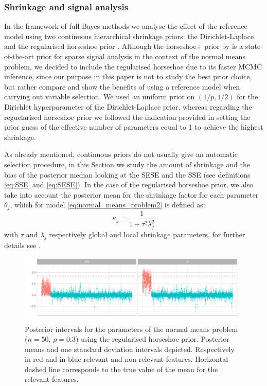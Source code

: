 \documentclass[american,]{article}
\theoremstyle{definition}
\begin{document}
\hypertarget{shrinkage-signal}{%
\subsubsection{Shrinkage and signal analysis}\label{shrinkage-signal}}
In the framework of full-Bayes methods we analyse the effect of the reference model using two continuous hierarchical shrinkage priors: the Dirichlet-Laplace \citep{paper:dirichlet_laplace} and the regularised horseshoe prior \citep{paper:rhs}. Although the horseshoe+ prior by \cite{paper:horseshoe+} is a state-of-the-art prior for sparse signal analysis in the context of the normal means problem, we decided to include the regularised horseshoe due to its faster MCMC inference, since our purpose in this paper is not to study the best prior choice, but rather compare and show the benefits of using a reference model when carrying out variable selection. We used an uniform prior on $(1/p,1/2)$ for the Dirichlet hyperparameter of the Dirichlet-Laplace prior, whereas regarding the reguelarised horseshoe prior we followed the indication provided in \cite{paper:rhs} setting the prior guess of the effective number of parameters equal to 1 to achieve the highest shrinkage.

As already mentioned, continuous priors do not usually give an automatic selection procedure, in this Section we study the amount of shrinkage and the bias of the posterior median looking at the SESE and the SSE (see definitions \eqref{eq:SSE} and \eqref{eq:SESE}). In the case of the regularised horseshoe prior, we also take into account the posterior mean for the shrinkage factor for each parameter $\theta_{j}$, which for model \eqref{eq:normal_means_problem2} is defined as:
\
\begin{equation}
\kappa_{j}=\frac{1}{1+\tau^{2}\lambda_{j}^{2}}
\end{equation}
with $\tau$ and $\lambda_{j}$ respectively global and local shrinkage parameters, for further details see \cite{paper:rhs}.

\begin{figure}[tp]
  \centering
  \includegraphics[width=0.98\textwidth]{graphics/post_int.pdf}
  \caption{Posterior intervals for the parameters of the normal means problem ($n=50$, $\rho=0.3$) using the regularised horseshoe prior. Posterior means and one standard deviation intervals depicted. Respectively in red and in blue relevant and non-relevant features. Horizontal dashed line corresponds to the true value of the mean for the relevant features.\\}
  \label{fig:posterior_intervals}
\end{figure}
\end{document}
